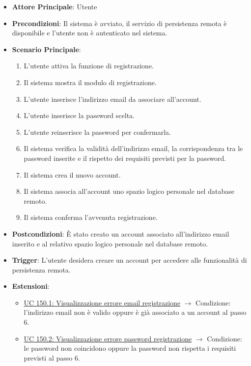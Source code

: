 \begin{itemize}
    \item \textbf{Attore Principale}: Utente
    \item \textbf{Precondizioni}: Il sistema è avviato, il servizio di persistenza remota è disponibile e l’utente non è autenticato nel sistema.
    \item \textbf{Scenario Principale}:
    \begin{enumerate}
        \item L'utente attiva la funzione di registrazione.
        \item Il sistema mostra il modulo di registrazione.
        \item L'utente inserisce l'indirizzo email da associare all'account.
        \item L'utente inserisce la password scelta.
        \item L'utente reinserisce la password per confermarla.
        \item Il sistema verifica la validità dell'indirizzo email, la corrispondenza
        tra le password inserite e il rispetto dei requisiti previsti per la password.
        \item Il sistema crea il nuovo account.
        \item Il sistema associa all'account uno spazio logico personale nel database remoto.
        \item Il sistema conferma l'avvenuta registrazione.
    \end{enumerate}
    \item \textbf{Postcondizioni}: È stato creato un account associato
    all'indirizzo email inserito e al relativo spazio logico personale
    nel database remoto.
    \item \textbf{Trigger}: L'utente desidera creare un account per accedere alle funzionalità di persistenza remota.
    \item \textbf{Estensioni}:
    \begin{itemize}
        \item \hyperlink{uc150.1}{UC 150.1: Visualizzazione errore email registrazione}
        $\rightarrow$ Condizione: l'indirizzo email non è valido oppure è già associato
        a un account al passo 6.
        \item \hyperlink{uc150.2}{UC 150.2: Visualizzazione errore password registrazione}
        $\rightarrow$ Condizione: le password non coincidono oppure la password non
        rispetta i requisiti previsti al passo 6.
    \end{itemize}
\end{itemize}

